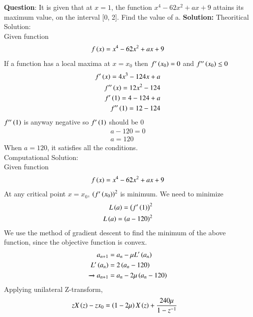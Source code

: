 \documentclass[journal]{IEEEtran}
\begin{document}
\textbf{Question}:\newline
It is given that at $x = 1$, the function $x^4 - 62x^2 + ax + 9$ attains its maximum value, on the interval [0, 2]. Find the value of a.
\newline
\textbf{Solution: }
\newline
Theoritical Solution:\\
Given function
\begin{align}
	f\left(x\right) = x^4 - 62x^2 + ax + 9
\end{align}
If a function has a local maxima at $x=x_0$ then $f^\prime\left(x_0\right) = 0$ and $f^{\prime\prime}\left(x_0\right) \le 0$
\begin{align}
	f^\prime\left(x\right) = 4x^3 - 124x + a \\
	f^{\prime\prime}\left(x\right) = 12x^2 - 124\\
	f^\prime\left(1\right) = 4-124+a\\
	f^{\prime\prime}\left(1\right) = 12 - 124\\
\end{align}
$f^{\prime\prime}\left(1\right)$ is anyway negative so $f^\prime\left(1\right)$ should be $0$
\begin{align}
	a-120 =0\\
	a = 120
\end{align}
When $a = 120$, it satisfies all the conditions.\\
Computational Solution:\\
Given function
\begin{align}
	f\left(x\right) = x^4 - 62x^2 + ax + 9
\end{align}
At any critical point $x=x_0$, $\left(f^\prime\left(x_0\right)\right)^2$ is minimum. We need to minimize
\begin{align}
L\left(a\right) = \left(f^\prime\left(1\right)\right)^2\\
L\left(a\right) = \left(a-120\right)^2
\end{align}
We use the method of gradient descent to find the minimum of the above function, since the objective function is convex.
\begin{align}
    a_{n+1} &= a_n - \mu L^{\prime}\left(a_n\right)\\
    L^{\prime}\left(a_n\right) &= 2\left(a_n-120\right)\\
    \xrightarrow{} a_{n+1} &= a_n - 2\mu\left(a_n-120\right)
\end{align}
Applying unilateral Z-transform,
\begin{align}
    zX\left(z\right) - zx_0 &= \left(1-2\mu\right)X\left(z\right)+\frac{240\mu}{1-z^{-1}}
\end{align}
\end{document}
